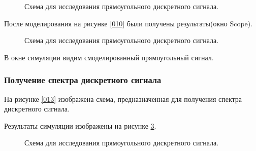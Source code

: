 \documentclass[a4paper,14pt]{extarticle}
\begin{document}
\begin{figure}[H]
\caption{Схема для исследования прямоугольного дискретного сигнала.}
\label{014}
\end{figure}

После моделирования на рисунке \ref{010} были получены результаты(окно Scope).

\begin{figure}[H]
\caption{Схема для исследования прямоугольного дискретного сигнала.}
\label{015}
\end{figure}

В окне симуляции видим смоделированный прямоугольный сигнал.

\subsubsection{Получение спектра дискретного сигнала}

На рисунке \ref{013} изображена схема, предназначенная для получения спектра дискретного сигнала.

Результаты симуляции изображены на рисунке \ref{016}.

\begin{figure}[H]
\caption{Схема для исследования прямоугольного дискретного сигнала.}
\label{016}
\end{figure}
\end{document}

